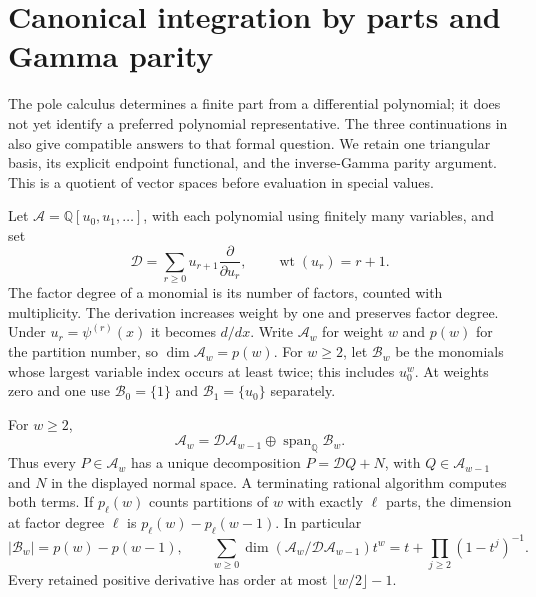 
\section{Canonical integration by parts and Gamma parity}
\label{ibp:section}

The pole calculus determines a finite part from a differential polynomial;
it does not yet identify a preferred polynomial representative.  The
three continuations in \cite{dpm:reports} also give compatible answers
to that formal question.  We retain one triangular basis, its explicit
endpoint functional, and the inverse-Gamma parity argument.  This is a
quotient of vector spaces before evaluation in special values.

Let $\mathcal A=\mathbb Q[u_0,u_1,\ldots]$, with each polynomial
using finitely many variables, and set
\[
 \mathcal D=\sum_{r\ge0}u_{r+1}\frac{\partial}{\partial u_r},
 \qquad \operatorname{wt}(u_r)=r+1.
\]
The factor degree of a monomial is its number of factors, counted with
multiplicity.  The derivation increases weight by one and preserves
factor degree.  Under $u_r=\psi^{(r)}(x)$ it becomes $d/dx$.
Write $\mathcal A_w$ for weight $w$ and $p(w)$ for the partition
number, so $\dim\mathcal A_w=p(w)$.
For $w\ge2$, let $\mathcal B_w$ be the monomials whose largest
variable index occurs at least twice; this includes $u_0^w$.
At weights zero and one use $\mathcal B_0=\{1\}$ and
$\mathcal B_1=\{u_0\}$ separately.

\begin{theorem}
\label{ibp:normal}
For $w\ge2$,
\begin{equation}\label{ibp:direct}
 \mathcal A_w=\mathcal D\mathcal A_{w-1}
          \oplus\operatorname{span}_{\mathbb Q}\mathcal B_w.
\end{equation}
Thus every $P\in\mathcal A_w$ has a unique decomposition
$P=\mathcal D Q+N$, with $Q\in\mathcal A_{w-1}$ and $N$ in
the displayed normal space.  A terminating rational algorithm computes
both terms.  If $p_\ell(w)$ counts partitions of $w$ with exactly
$\ell$ parts, the dimension at factor degree $\ell$ is
$p_\ell(w)-p_\ell(w-1)$.  In particular
\[
 |\mathcal B_w|=p(w)-p(w-1),\qquad
 \sum_{w\ge0}\dim(\mathcal A_w/\mathcal D\mathcal A_{w-1})t^w
       =t+\prod_{j\ge2}(1-t^j)^{-1}.
\]
Every retained positive derivative has order at most
$\lfloor w/2\rfloor-1$.
\end{theorem}

